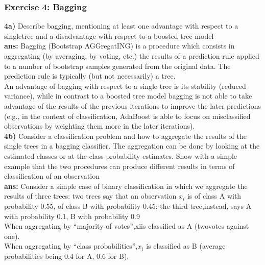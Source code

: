 \documentclass[a4paper, norsk, 8pt]{article}
\begin{document}
\begin{multicols*}{2}
\subsubsection*{\scriptsize Exercise 4: Bagging}
\textbf{4a)} Describe bagging, mentioning at least one advantage with respect to a singletree and a disadvantage with respect to a boosted tree model\\
\textbf{ans:} Bagging (Bootstrap AGGregatING) is a procedure which consists in aggregating (by averaging, by voting, etc.) the results of a prediction rule applied to a number of bootstrap samples generated from the original data. The prediction rule is typically (but not necessarily) a tree.\\
An advantage of bagging with respect to a single tree is its stability (reduced variance), while in contrast to a boosted tree model bagging is not able to take advantage of the results of the previous iterations to improve the later predictions (e.g., in the context of classification, AdaBoost is able to focus on misclassified observations by weighting them more in the later iterations).\\
\textbf{4b)} Consider a classification problem and how to aggregate the results of the single trees in a bagging classifier. The aggregation can be done by looking at the estimated classes or at the class-probability estimates.  Show with a simple example that the two procedures can produce different results in terms of classification of an observation\\
\textbf{ans:} Consider a simple case of binary classification in which we aggregate the results of three trees: two trees say that an observation $x_i$ is of class A with probability 0.55, of class B with probability 0.45; the third tree,instead, says A with probability 0.1, B with probability 0.9\\
When aggregating by “majority of votes”,xiis classified as A (twovotes against one).\\
When aggregating by “class probabilities”,$x_i$ is classified as B (average probabilities being 0.4 for A, 0.6 for B).

\end{multicols*}
\end{document}
